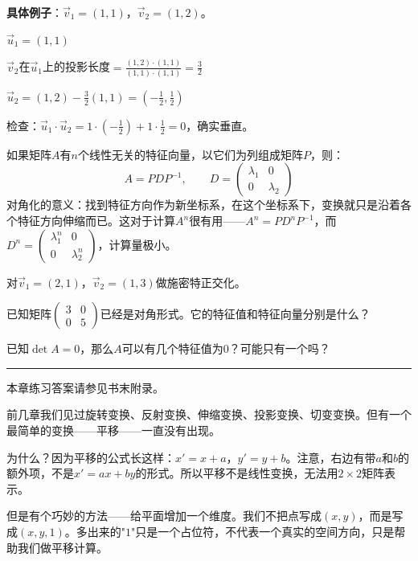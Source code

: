 \documentclass[a4paper,12pt]{ctexart}
\begin{document}
\textbf{具体例子}：$\vec v_1=(1,1)$，$\vec v_2=(1,2)$。

$\vec u_1=(1,1)$

$\vec v_2$在$\vec u_1$上的投影长度$=\frac{(1,2)\cdot(1,1)}{(1,1)\cdot(1,1)}=\frac{3}{2}$

$\vec u_2=(1,2)-\frac32(1,1)=(-\frac12,\frac12)$

检查：$\vec u_1\cdot\vec u_2=1\cdot(-\frac12)+1\cdot\frac12=0$，确实垂直。


如果矩阵$A$有$n$个线性无关的特征向量，以它们为列组成矩阵$P$，则：
\[
A = PDP^{-1},\qquad D=\begin{pmatrix}\lambda_1&0\\0&\lambda_2\end{pmatrix}
\]
对角化的意义：找到特征方向作为新坐标系，在这个坐标系下，变换就只是沿着各个特征方向伸缩而已。这对于计算$A^n$很有用——$A^n=PD^n P^{-1}$，而$D^n=\begin{pmatrix}\lambda_1^n&0\\0&\lambda_2^n\end{pmatrix}$，计算量极小。

\begin{exercise}[施密特与对角化练习]
\item 对$\vec v_1=(2,1)$，$\vec v_2=(1,3)$做施密特正交化。
\item 已知矩阵$\begin{pmatrix}3&0\\0&5\end{pmatrix}$已经是对角形式。它的特征值和特征向量分别是什么？
\item 已知$\det A=0$，那么$A$可以有几个特征值为$0$？可能只有一个吗？
\end{exercise}

\vfill
\noindent\rule{\textwidth}{0.4pt}
本章练习答案请参见书末附录。

\newpage



前几章我们见过旋转变换、反射变换、伸缩变换、投影变换、切变变换。但有一个最简单的变换——平移——一直没有出现。

为什么？因为平移的公式长这样：$x'=x+a$，$y'=y+b$。注意，右边有带$a$和$b$的额外项，不是$x'=ax+by$的形式。所以平移不是线性变换，无法用$2\times2$矩阵表示。

但是有个巧妙的方法——给平面增加一个维度。我们不把点写成$(x,y)$，而是写成$(x,y,1)$。多出来的"$1$"只是一个占位符，不代表一个真实的空间方向，只是帮助我们做平移计算。
\end{document}
